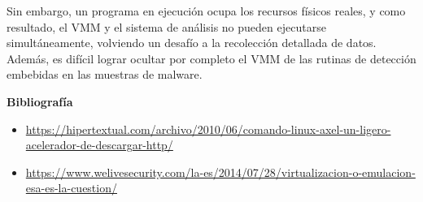 \documentclass[11pt, a4paper]{report}
\begin{document}
Sin embargo, un programa en ejecución ocupa los recursos físicos reales, y como
resultado, el VMM y el sistema de análisis no pueden ejecutarse
simultáneamente, volviendo un desafío a la recolección detallada de datos.
Además, es difícil lograr ocultar por completo el VMM de las rutinas de
detección embebidas en las muestras de malware. \\

\newpage

\textbf{Bibliografía} \\

\begin{itemize}

\item \url{https://hipertextual.com/archivo/2010/06/comando-linux-axel-un-ligero-acelerador-de-descargar-http/}

\item \url{https://www.welivesecurity.com/la-es/2014/07/28/virtualizacion-o-emulacion-esa-es-la-cuestion/}

\end{itemize}
\end{document}
